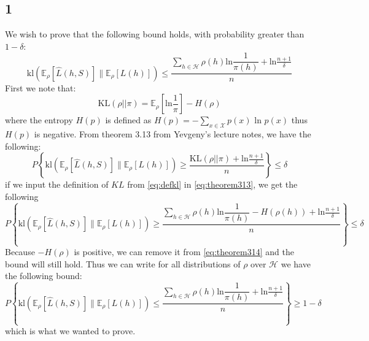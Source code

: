 \documentclass{article}
\begin{document}
\subsection{1}
We wish to prove that the following bound holds, with probability greater than $1-\delta$:
\begin{equation}
\text{kl}\left( \mathbb{E}_\rho \left[\hat{L}(h,S)\right] \parallel \mathbb{E}_\rho \left[L(h)\right] \right) \leq \dfrac{\sum\limits_{h \in \mathcal{H}} \rho(h) \text{ln} \dfrac{1}{\pi(h)} + \text{ln} \frac{n+1}{\delta}}{n}
\end{equation}
First we note that:
\begin{equation}
\label{eq:defkl}
\text{KL}(\rho || \pi) = \mathbb{E}_\rho \left[\text{ln} \dfrac{1}{\pi}\right] - H(\rho)
\end{equation}
where the entropy $H(p)$ is defined as $H(p)= - \sum\limits_{x \in \mathcal{X}} p(x) \text{ ln } p(x)$ thus $H(p)$ is negative. From theorem 3.13 from Yevgeny's lecture notes, we have the following:
\begin{equation}
\label{eq:theorem313}
P \left\lbrace \text{kl}\left( \mathbb{E}_\rho \left[\hat{L}(h,S)\right] \parallel \mathbb{E}_\rho \left[L(h)\right] \right) \geq \dfrac{\text{KL}(\rho || \pi) + \text{ln} \frac{n+1}{\delta}}{n}
\right\rbrace \leq \delta
\end{equation}
if we input the definition of $KL$ from \eqref{eq:defkl} in \eqref{eq:theorem313}, we get the following
\begin{equation}
\label{eq:theorem314}
P \left\lbrace \text{kl}\left( \mathbb{E}_\rho \left[\hat{L}(h,S)\right] \parallel \mathbb{E}_\rho \left[L(h)\right] \right) \geq \dfrac{\sum\limits_{h \in \mathcal{H}} \rho(h) \text{ln} \dfrac{1}{\pi(h)} - H(\rho(h)) + \text{ln} \frac{n+1}{\delta}}{n}
\right\rbrace \leq \delta
\end{equation}
Because $-H(\rho)$ is positive, we can remove it from \eqref{eq:theorem314} and the bound will still hold. Thus we can write for all distributions of $\rho$ over $\mathcal{H}$ we have the following bound:
\begin{equation}
P \left\lbrace \text{kl}\left( \mathbb{E}_\rho \left[\hat{L}(h,S)\right] \parallel \mathbb{E}_\rho \left[L(h)\right] \right)  \leq \dfrac{\sum\limits_{h \in \mathcal{H}} \rho(h) \text{ln} \dfrac{1}{\pi(h)} + \text{ln} \frac{n+1}{\delta}}{n}
\right\rbrace \geq  1- \delta
\end{equation}
which is what we wanted to prove.
\end{document}

